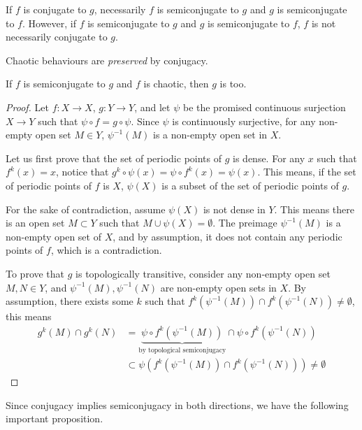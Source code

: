 If $f$ is conjugate to $g$, necessarily $f$ is semiconjugate to $g$ and $g$ is semiconjugate to $f$. 
However, if $f$ is semiconjugate to $g$ and $g$ is semiconjugate to $f$, $f$ is not necessarily conjugate to $g$. 

Chaotic behaviours are \emph{preserved} by conjugacy.


\begin{thm}\label{th_semicong_chaos}
	If $f$ is semiconjugate to $g$ and $f$ is chaotic, then $g$ is too.
\end{thm}

\begin{proof}
	Let $f: X \rightarrow X$, $g:  Y \rightarrow Y$, and let $\psi$ be the promised continuous surjection $X \rightarrow Y$ such that
	$\psi \circ f = g \circ \psi$. 
	Since $\psi$ is continuously surjective, for any non-empty open set $M \in Y$, $\psi^{-1}(M)$ is a non-empty open set in $X$.

	Let us first prove that the set of periodic points of $g$ is dense.
	For any $x$ such that $f^k(x) = x$, notice that $g^k \circ \psi (x) = \psi \circ f^k (x) = \psi(x)$. 
	This means, if the set of periodic points of $f$ is $X$, $\psi(X)$ is a subset of the set of periodic points of $g$.

	For the sake of contradiction, assume $\psi(X)$ is not dense in $Y$. 
	This means there is an open set $M \subset Y$ such that $M \cup \psi(X) = \emptyset$.
	The preimage $\psi^{-1}(M)$ is a non-empty open set of $X$, and by assumption, it does not contain any periodic points of $f$, which is a contradiction.

	To prove that $g$ is topologically transitive, consider any non-empty open set $M, N \in Y$, and $\psi^{-1}(M), \psi^{-1}(N)$ are non-empty open sets in $X$. 
	By assumption, there exists some $k$ such that $f^k(\psi^{-1}(M)) \cap f^k(\psi^{-1}(N)) \neq \emptyset$, this means 
	\begin{align*}
		g^k(M) \cap g^k(N) 
		&= \underbrace{\psi \circ f^k(\psi^{-1}(M))}_{\text{by topological semiconjugacy}} \cap \psi \circ f^k(\psi^{-1}(N)) \\
	    &\subset \psi( f^k(\psi^{-1}(M)) \cap  f^k(\psi^{-1}(N))) \neq \emptyset
	\end{align*}
\end{proof}

Since conjugacy implies semiconjugacy in both directions, we have the following important proposition.

